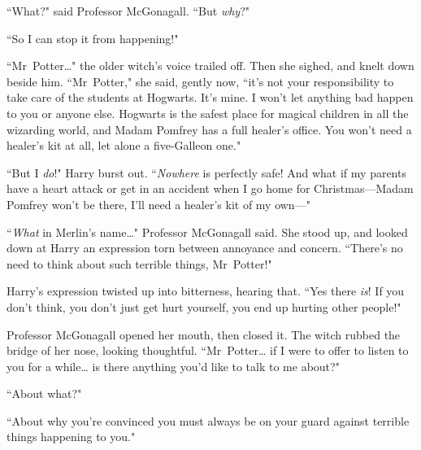 ``What?" said Professor McGonagall. ``But \emph{why}?"

``So I can stop it from happening!"

``Mr~Potter{\ldots}" the older witch's voice trailed off. Then she sighed, and knelt down beside him. ``Mr~Potter," she said, gently now, ``it's not your responsibility to take care of the students at Hogwarts. It's mine. I won't let anything bad happen to you or anyone else. Hogwarts is the safest place for magical children in all the wizarding world, and Madam Pomfrey has a full healer's office. You won't need a healer's kit at all, let alone a five-Galleon one."

``But I \emph{do}!" Harry burst out. ``\emph{Nowhere} is perfectly safe! And what if my parents have a heart attack or get in an accident when I go home for Christmas—Madam Pomfrey won't be there, I'll need a healer's kit of my own—"

``\emph{What} in Merlin's name{\ldots}" Professor McGonagall said. She stood up, and looked down at Harry an expression torn between annoyance and concern. ``There's no need to think about such terrible things, Mr~Potter!"

Harry's expression twisted up into bitterness, hearing that. ``Yes there \emph{is}! If you don't think, you don't just get hurt yourself, you end up hurting other people!"

Professor McGonagall opened her mouth, then closed it. The witch rubbed the bridge of her nose, looking thoughtful. ``Mr~Potter{\ldots} if I were to offer to listen to you for a while{\ldots} is there anything you'd like to talk to me about?"

``About what?"

``About why you're convinced you must always be on your guard against terrible things happening to you."

